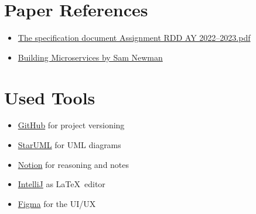 \section{Paper References}
\label{sec:paper_references}%
\begin{itemize}
    \item \href{https://polimi365-my.sharepoint.com/:b:/g/personal/10685242_polimi_it/EWPABzzjfF9EsgYvSiuvdAIBAz6qnjdfLuPE8kwQSxeyCg?e=6qasKD}{The specification document Assignment RDD AY 2022--2023.pdf}
    \item \href{https://www.oreilly.com/library/view/building-microservices/9781491950340/}{Building Microservices by Sam Newman}
\end{itemize}


\section{Used Tools}
\label{sec:used_tools}%
\begin{itemize}
    \item \href{https://github.com/}{GitHub} for project versioning
    \item \href{https://staruml.io/}{StarUML} for UML diagrams
    \item \href{https://www.notion.so/}{Notion} for reasoning and notes
    \item \href{https://www.jetbrains.com/idea/}{IntelliJ} as \LaTeX\ editor
    \item \href{https://www.figma.com/}{Figma} for the UI/UX
\end{itemize}
